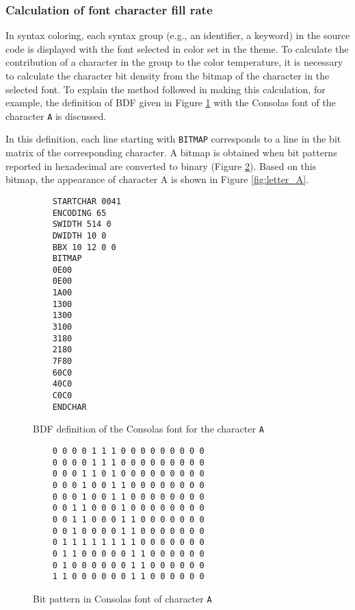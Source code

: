 \documentclass{article}
\begin{document}
\subsubsection{Calculation of font character fill rate}

In syntax coloring, each syntax group (e.g., an identifier, a keyword) in the source code is displayed with the font selected in color set in the theme. To calculate the contribution of a character in the group to the color temperature, it is necessary to calculate the character bit density from the bitmap of the character in the selected font. To explain the method followed in making this calculation, for example, the definition of BDF given in Figure \ref{code:letter_A_BDF} with the Consolas font of the character \texttt{A} is discussed.

In this definition, each line starting with \texttt{BITMAP} corresponds to a line in the bit matrix of the corresponding
character. A bitmap is obtained when bit patterns reported in hexadecimal are converted to binary (Figure
\ref{fig:letter_A_bitmap}). Based on this bitmap, the appearance of character A is shown in Figure \ref{fig:letter_A}.

\begin{figure}[htbp]
  \caption{BDF definition of the Consolas font for the character \texttt{A}}
  \label{code:letter_A_BDF}

  \centering
  \begin{BVerbatim}
    STARTCHAR 0041
    ENCODING 65
    SWIDTH 514 0
    DWIDTH 10 0
    BBX 10 12 0 0
    BITMAP
    0E00
    0E00
    1A00
    1300
    1300
    3100
    3180
    2180
    7F80
    60C0
    40C0
    C0C0
    ENDCHAR
  \end{BVerbatim}
\end{figure}

\begin{figure}[htbp]
  \caption{Bit pattern in Consolas font of character \texttt{A}}
  \label{fig:letter_A_bitmap}

  \centering
  \begin{BVerbatim}
    0 0 0 0 1 1 1 0 0 0 0 0 0 0 0 0 
    0 0 0 0 1 1 1 0 0 0 0 0 0 0 0 0 
    0 0 0 1 1 0 1 0 0 0 0 0 0 0 0 0 
    0 0 0 1 0 0 1 1 0 0 0 0 0 0 0 0 
    0 0 0 1 0 0 1 1 0 0 0 0 0 0 0 0 
    0 0 1 1 0 0 0 1 0 0 0 0 0 0 0 0 
    0 0 1 1 0 0 0 1 1 0 0 0 0 0 0 0 
    0 0 1 0 0 0 0 1 1 0 0 0 0 0 0 0 
    0 1 1 1 1 1 1 1 1 0 0 0 0 0 0 0 
    0 1 1 0 0 0 0 0 1 1 0 0 0 0 0 0 
    0 1 0 0 0 0 0 0 1 1 0 0 0 0 0 0 
    1 1 0 0 0 0 0 0 1 1 0 0 0 0 0 0 
  \end{BVerbatim}
\end{figure}
\end{document}
